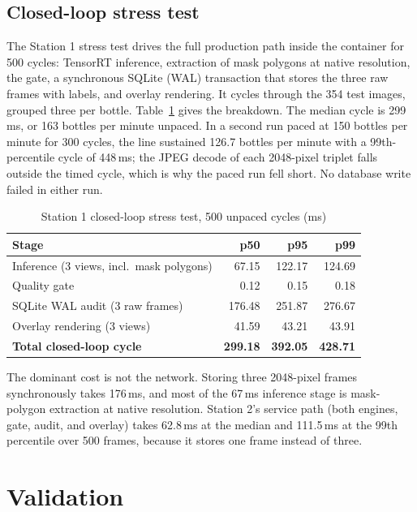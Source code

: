 \subsection{Closed-loop stress test}
The Station 1 stress test drives the full production path inside the container for 500 cycles: TensorRT inference, extraction of mask polygons at native resolution, the gate, a synchronous SQLite (WAL) transaction that stores the three raw frames with labels, and overlay rendering. It cycles through the 354 test images, grouped three per bottle. Table~\ref{tab:stress} gives the breakdown. The median cycle is 299\,ms, or 163 bottles per minute unpaced. In a second run paced at 150 bottles per minute for 300 cycles, the line sustained 126.7 bottles per minute with a 99th-percentile cycle of 448\,ms; the JPEG decode of each 2048-pixel triplet falls outside the timed cycle, which is why the paced run fell short. No database write failed in either run.

\begin{table}[htbp]
\centering
\caption{Station 1 closed-loop stress test, 500 unpaced cycles (ms)}
\label{tab:stress}
\footnotesize
\begin{tabular}{|l|r|r|r|}
\hline
\textbf{Stage} & \textbf{p50} & \textbf{p95} & \textbf{p99} \\ \hline
Inference (3 views, incl.\ mask polygons) & 67.15 & 122.17 & 124.69 \\ \hline
Quality gate & 0.12 & 0.15 & 0.18 \\ \hline
SQLite WAL audit (3 raw frames) & 176.48 & 251.87 & 276.67 \\ \hline
Overlay rendering (3 views) & 41.59 & 43.21 & 43.91 \\ \hline
\textbf{Total closed-loop cycle} & \textbf{299.18} & \textbf{392.05} & \textbf{428.71} \\ \hline
\end{tabular}
\end{table}

The dominant cost is not the network. Storing three 2048-pixel frames synchronously takes 176\,ms, and most of the 67\,ms inference stage is mask-polygon extraction at native resolution. Station 2's service path (both engines, gate, audit, and overlay) takes 62.8\,ms at the median and 111.5\,ms at the 99th percentile over 500 frames, because it stores one frame instead of three.

\section{Validation}
\label{sec:validation}

